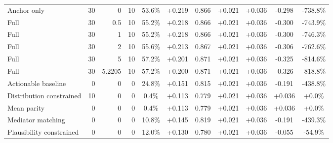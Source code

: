 \begin{table}[htbp]
\begin{tabular}{lrrrccccccc}
Anchor only & 30 & 0 & 10 & 53.6\% & +0.219 & 0.866 & +0.021 & +0.036 & -0.298 & -738.8\% \\
Full & 30 & 0.5 & 10 & 55.2\% & +0.218 & 0.866 & +0.021 & +0.036 & -0.300 & -743.9\% \\
Full & 30 & 1 & 10 & 55.2\% & +0.218 & 0.866 & +0.021 & +0.036 & -0.300 & -746.3\% \\
Full & 30 & 2 & 10 & 55.6\% & +0.213 & 0.867 & +0.021 & +0.036 & -0.306 & -762.6\% \\
Full & 30 & 5 & 10 & 57.2\% & +0.201 & 0.871 & +0.021 & +0.036 & -0.325 & -814.6\% \\
Full & 30 & 5.2205 & 10 & 57.2\% & +0.200 & 0.871 & +0.021 & +0.036 & -0.326 & -818.8\% \\
Actionable baseline & 0 & 0 & 0 & 24.8\% & +0.151 & 0.815 & +0.021 & +0.036 & -0.191 & -438.8\% \\
Distribution constrained & 10 & 0 & 0 & 0.4\% & +0.113 & 0.779 & +0.021 & +0.036 & +0.036 & +0.0\% \\
Mean parity & 0 & 0 & 0 & 0.4\% & +0.113 & 0.779 & +0.021 & +0.036 & +0.036 & +0.0\% \\
Mediator matching & 0 & 0 & 0 & 10.8\% & +0.145 & 0.819 & +0.021 & +0.036 & -0.191 & -439.3\% \\
Plausibility constrained & 0 & 0 & 0 & 12.0\% & +0.130 & 0.780 & +0.021 & +0.036 & -0.055 & -54.9\% \\
\bottomrule
\end{tabular}
\end{table}